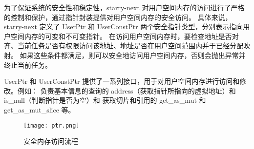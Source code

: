为了保证系统的安全性和稳定性，starry-next 对用户空间内存的访问进行了严格的控制和保护，通过指针封装提供对用户空间内存的安全访问。
具体来说，starry-next 定义了 UserPtr 和 UserConstPtr 两个安全指针类型，分别表示指向用户空间内存的可变和不可变指针。
在访问用户空间内存时，要检查地址是否对齐、当前任务是否有权限访问该地址、地址是否在用户空间范围内并于已经分配映射。
如果这些条件都满足，则可以安全地访问用户空间内存，否则会抛出异常并终止当前任务。

UserPtr 和 UserConstPtr 提供了一系列接口，用于对用户空间内存进行访问和修改。例如：
负责基本信息的查询的 address（获取指针所指向的虚拟地址）和 is\_null（判断指针是否为空）和
获取切片和引用的 get\_as\_mut 和 get\_as\_mut\_slice 等。

\begin{figure}[H]
    \centering
    \texttt{[image: ptr.png]}
    \caption{安全内存访问流程}
    \label{fig:ptr}
\end{figure}